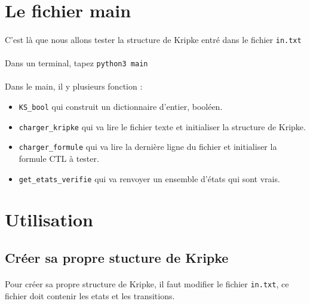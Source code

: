 \documentclass[12pt,a4paper]{report}
\begin{document}
\section*{Le fichier main}

\paragraph{}C'est là que nous allons tester la structure de Kripke entré dans le fichier \verb+in.txt+
\paragraph{}Dans un terminal, tapez \verb+python3 main+

\paragraph{}Dans le main, il y plusieurs fonction :

\begin{itemize}
    \item \verb+KS_bool+ qui construit un dictionnaire d'entier, booléen.
    \item \verb+charger_kripke+ qui va lire le fichier texte et initialiser la structure de Kripke.
    \item \verb+charger_formule+ qui va lire la dernière ligne du fichier et initialiser la formule CTL à tester.
    \item \verb+get_etats_verifie+ qui va renvoyer un ensemble d'états qui sont vrais.
\end{itemize}

\section*{Utilisation}

\subsection*{Créer sa propre stucture de Kripke}

\paragraph{}Pour créer sa propre structure de Kripke, il faut modifier le fichier \verb+in.txt+, ce fichier doit contenir les etats et les transitions.
\end{document}
